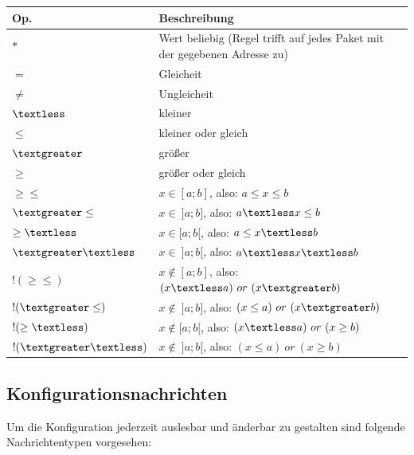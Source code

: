 \documentclass{IEEEtran}
\begin{document}
        \begin{center}
            \begin{tabular}{p{}p{}}
                \toprule
                    \textbf{Op.} & \textbf{Beschreibung} \\
                \midrule
                    $*$             &   Wert beliebig (Regel trifft auf jedes
                                        Paket mit der gegebenen Adresse zu) \\
                    $=$             &   Gleicheit \\
                    $\neq$          &   Ungleicheit \\
                    $\textless$     &   kleiner \\
                    $\leq$          &   kleiner oder gleich \\
                    $\textgreater$  &   größer \\
                    $\geq$          &   größer oder gleich \\
                    $\geq \leq$     &   $x \in [a;b]$, also: $a \leq x \leq b$ \\
                    $\textgreater \leq$ &   $x \in~]a;b]$, also: $a \textless x \leq b$ \\
                    $\geq \textless$ &  $x \in [a;b[$, also: $a \leq x \textless b$ \\
                    $\textgreater \textless$ &  $x \in~]a;b[$, also: $a \textless x \textless b$ \\
                    $!(\geq \leq)$     &   $x \notin [a;b]$, also: $(x \textless a)~or~(x \textgreater b)$ \\
                    $!(\textgreater \leq)$ &   $x \notin~]a;b]$, also: $(x \leq a)~or~(x \textgreater b)$ \\
                    $!(\geq \textless)$ &  $x \notin [a;b[$, also: $(x \textless a)~or~(x \geq b)$ \\
                    $!(\textgreater \textless)$ &  $x \notin~]a;b[$, also: $(x \leq a)~or~(x \geq b)$ \\
                \bottomrule
            \end{tabular}
        \end{center}
    \subsection{Konfigurationsnachrichten}
        Um die Konfiguration jederzeit auslesbar und änderbar zu gestalten
        sind folgende Nachrichtentypen vorgesehen:
\end{document}
